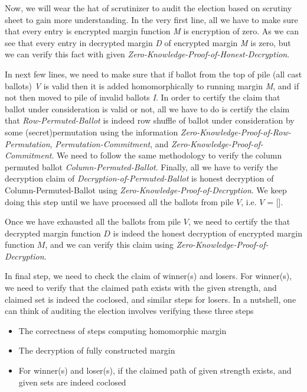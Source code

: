 \documentclass{llncs}
\begin{document}
Now, we will wear the hat of scrutinizer to audit the election based on 
 scrutiny sheet to gain more understanding. In the very first line, all we 
 have to make sure that every entry is encrypted margin function \textit{M} 
 is encryption 
 of zero. As we can see that every entry in decrypted margin \textit{D} 
 of encrypted margin \textit{M} is zero, but we can verify this fact with 
 given \textit{Zero-Knowledge-Proof-of-Honest-Decryption}.
 
 In next few lines, we need to make sure that if ballot from the top of 
 pile (all cast ballots) \textit{V} is valid then it is added 
 homomorphically to  running margin \textit{M}, 
 and if not then moved to pile of invalid ballots \textit{I}. In 
 order to certify the claim that ballot under consideration is valid 
 or not, all we have to do is certify the claim that 
 \textit{Row-Permuted-Ballot} 
 is indeed row shuffle of ballot under consideration by 
 some (secret)permutation using the information  
 \textit{Zero-Knowledge-Proof-of-Row-Permutation}, 
 \textit{Permutation-Commitment}, and 
 \textit{Zero-Knowledge-Proof-of-Commitment}. 
 We need to follow the same methodology 
 to verify the column permuted ballot \textit{Column-Permuted-Ballot}. 
 Finally, all we have to verify the decryption claim of 
 \textit{Decryption-of-Permuted-Ballot}
 is honest decryption of Column-Permuted-Ballot using 
 \textit{Zero-Knowledge-Proof-of-Decryption}. We keep doing this 
 step until we have 
 processed all the ballots from pile $V$, i.e. $V$ = []. 
 
 Once we have exhausted all the ballots from pile $V$, we 
 need to certify the that decrypted margin function $D$ is indeed the 
 honest decryption of encrypted margin function $M$, and we can 
 verify this claim using \textit{Zero-Knowledge-Proof-of-Decryption}.
 
 In final step, we need to check the claim of winner(s) and losers. 
 For winner(s), we need to verify that the claimed path exists with 
 the given strength, and claimed set is indeed the coclosed, and similar
 steps for losers. In a nutshell, one can 
think of auditing the election involves verifying these three steps
\begin{itemize}
 \item The correctness of steps computing homomorphic margin 
 \item The decryption of fully constructed margin
 \item For winner(s) and loser(s), 
       if the claimed path of given strength exists, and given sets are 
       indeed coclosed 
\end{itemize} 
\end{document}
